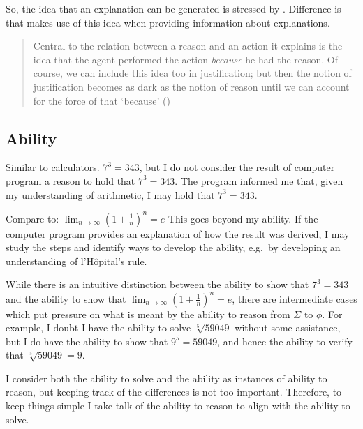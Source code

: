 \documentclass[10pt]{article}
\begin{document}
\begin{note}[Davidson]
  So, the idea that an explanation can be generated is stressed by \citeauthor{Davidson:2001aa}.
  Difference is that \citeauthor{Davidson:2001aa} makes use of this idea when providing information about explanations.



  \begin{quote}
    Central to the relation between a reason and an action it explains is the idea that the agent performed the action \emph{because} he had the reason.
    Of course, we can include this idea too in justification; but then the notion of justification becomes as dark as the notion of reason until we can account for the force of that ‘because’\nolinebreak
    \mbox{}\hfill(\citeyear[9]{Davidson:2001aa})
  \end{quote}
\end{note}



\subsection{Ability}
\label{sec:ability}

\begin{note}
  Similar to calculators.
  \(7^{3} = 343\), but I do not consider the result of computer program a reason to hold that \(7^{3} = 343\).
  The program informed me that, given my understanding of arithmetic, I may hold that \(7^{3} = 343\).

  Compare to:
  \(\lim_{n \to \infty}\left(1 + \frac{1}{n} \right)^{n} = e\)
  This goes beyond my ability.
  If the computer program provides an explanation of how the result was derived, I may study the steps and identify ways to develop the ability, e.g.\ by developing an understanding of l'H\^{o}pital's rule.

  While there is an intuitive distinction between the ability to show that \(7^{3} = 343\) and the ability to show that \(\lim_{n \to \infty}\left(1 + \frac{1}{n} \right)^{n} = e\), there are intermediate cases which put pressure on what is meant by the ability to reason from \(\Sigma\) to \(\phi\).
  For example, I doubt I have the ability to solve \(\sqrt[5]{59049}\) without some assistance, but I do have the ability to show that \(9^{5} = 59049\), and hence the ability to verify that \(\sqrt[5]{59049} = 9\).

  I consider both the ability to solve and the ability as instances of ability to reason, but keeping track of the differences is not too important.
  Therefore, to keep things simple I take talk of the ability to reason to align with the ability to solve.
\end{note}
\end{document}
